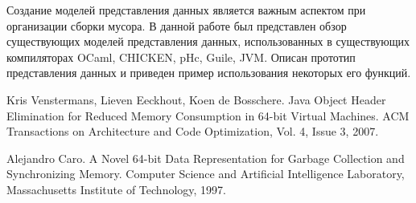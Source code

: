 Создание моделей представления данных является важным аспектом при организации сборки мусора. В данной работе был представлен
обзор существующих моделей представления данных, использованных в существующих компиляторах OCaml, CHICKEN, pHc, Guile, JVM. 
Описан прототип представления данных и приведен пример использования некоторых его функций.

\begin{thebibliography}{99}
Kris Venstermans, Lieven Eeckhout, Koen de Bosschere.
Java Object Header Elimination for Reduced Memory Consumption in 64-bit Virtual Machines. ACM Transactions on Architecture and Code Optimization,
Vol. 4, Issue 3, 2007.

Alejandro Caro. A Novel 64-bit Data Representation for Garbage Collection and Synchronizing Memory. Computer Science and Artificial Intelligence Laboratory, 
Massachusetts Institute of Technology, 1997.
\end{thebibliography}
